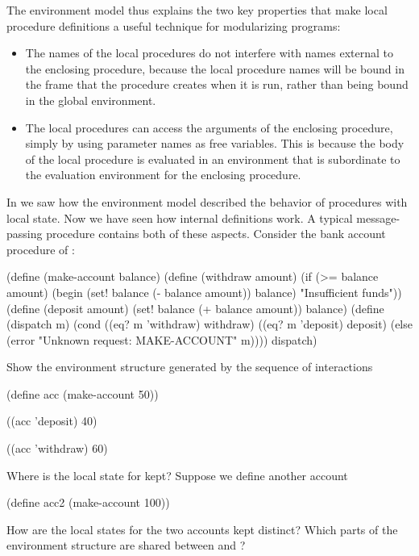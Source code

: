 The environment model thus explains the two key properties that make local procedure definitions a useful technique for modularizing programs:
\begin{itemize}

	\item
		The names of the local procedures do not interfere with names external to the enclosing procedure, because the local procedure names will be bound in the frame that the procedure creates when it is run, rather than being bound in the global environment.

	\item
		The local procedures can access the arguments of the enclosing procedure, simply by using parameter names as free variables.
		This is because the body of the local procedure is evaluated in an environment that is subordinate to the evaluation environment for the enclosing procedure.

\end{itemize}



\begin{exercise}
	\label{Exercise 3.11}
	In  we saw how the environment model described the behavior of procedures with local state.
	Now we have seen how internal definitions work.
	A typical message-passing procedure contains both of these aspects.
	Consider the bank account procedure of :
	\begin{scheme}
	  (define (make-account balance)
	    (define (withdraw amount)
	      (if (>= balance amount)
	          (begin (set! balance (- balance amount))
	                 balance)
	          "Insufficient funds"))
	    (define (deposit amount)
	      (set! balance (+ balance amount))
	      balance)
	    (define (dispatch m)
	      (cond ((eq? m 'withdraw) withdraw)
	            ((eq? m 'deposit) deposit)
	            (else
	             (error "Unknown request: MAKE-ACCOUNT"
	                    m))))
	    dispatch)
	\end{scheme}
	Show the environment structure generated by the sequence of interactions
	\begin{scheme}
	  (define acc (make-account 50))

	  ((acc 'deposit) 40)
	  ~~

	  ((acc 'withdraw) 60)
	  ~~
	\end{scheme}
	Where is the local state for  kept?
	Suppose we define another account
	\begin{scheme}
	  (define acc2 (make-account 100))
	\end{scheme}
	How are the local states for the two accounts kept distinct?
	Which parts of the environment structure are shared between  and ?
\end{exercise}
